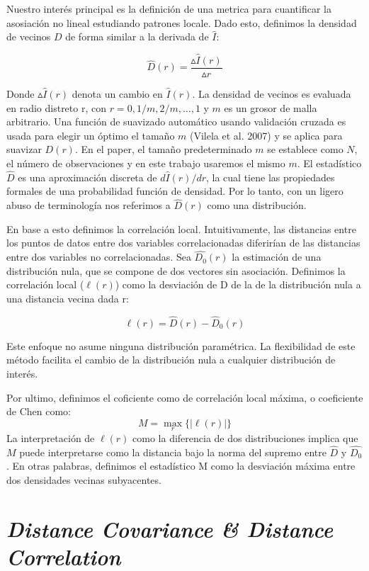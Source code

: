 	Nuestro inter\'es principal es la definici\'on  de una metrica para cuantificar la asosiaci\'on no lineal estudiando patrones locale. Dado esto, definimos la densidad de vecinos $D$ de forma similar a la derivada de $\hat{I}$: 

	$$
		\hat{D}(r)= \frac{\vartriangle\hat{I}(r)}{\vartriangle r}
	$$

	Donde $\vartriangle\hat{I}(r)$ denota un cambio en $\hat{I}(r)$. La densidad de vecinos es evaluada en radio distreto r, con $r=0,1/m, 2/m, \dots, 1$  y $m$ es un grosor de malla arbitrario. Una funci\'on de suavizado autom\'atico usando validaci\'on cruzada es usada para elegir un \'optimo el tama\~no $m$ (Vilela et al. 2007) y se aplica para suavizar $D(r)$. En el paper, el tama\~no predeterminado $m$ se establece como $N$, el n\'umero de observaciones y en este trabajo usaremos el mismo $m$. El estad\'istico $\hat{D}$ es una aproximaci\'on discreta de $d\hat{I}(r)/d r$, la cual tiene las propiedades formales de una probabilidad funci\'on de densidad. Por lo tanto, con un ligero abuso de terminolog\'ia nos referimos a $\widehat{D}(r)$ como una distribuci\'on.

	En base a esto definimos la correlaci\'on local. Intuitivamente, las distancias entre los puntos de datos entre dos variables correlacionadas diferir\'ian de las distancias entre dos variables no correlacionadas. Sea $\widehat{D_0}(r)$ la estimaci\'on de una distribuci\'on nula, que se compone de dos vectores sin asociaci\'on. Definimos la correlaci\'on local ($\ell(r)$) como la desviaci\'on de D de la de la distribuci\'on nula a una distancia vecina dada r:

	$$
		\ell(r)=\widehat{D}(r)-\widehat{D}_{0}(r)
	$$

	Este enfoque no asume ninguna distribuci\'on param\'etrica. La flexibilidad de este m\'etodo facilita el cambio de la distribuci\'on nula a cualquier distribuci\'on de inter\'es. 
	
	Por ultimo, definimos el coficiente como de correlaci\'on local m\'axima, o coeficiente de Chen como:
	$$
		M=\max _{r}\{|\ell(r)|\}
	$$
	La interpretaci\'on de $\ell(r)$ como la diferencia de dos distribuciones implica que $M$ puede interpretarse como la distancia bajo la norma del supremo entre $\widehat{D}$ y $\widehat{D_0}$. En otras palabras, definimos el estad\'istico M como la desviaci\'on m\'axima entre dos densidades vecinas subyacentes.

\section[]{\textit{Distance Covariance \& Distance Correlation}} 


